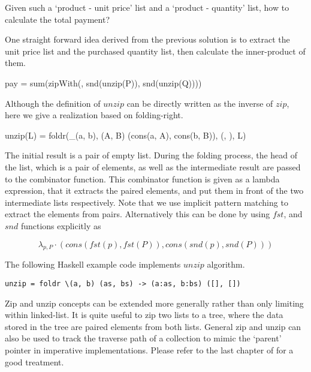 \documentclass[UTF8]{article}
\begin{document}
Given such a `product - unit price' list and a `product - quantity' list, how to calculate the total payment?

One straight forward idea derived from the previous solution is to extract the unit price list and the purchased
quantity list, then calculate the inner-product of them.

\be
pay = sum(zipWith(\times, snd(unzip(P)), snd(unzip(Q))))
\ee

Although the definition of $unzip$ can be directly written as the inverse of $zip$, here we give a realization based on
folding-right.

\be
unzip(L) = foldr(\lambda_{(a, b), (A, B)} \cdot (cons(a, A), cons(b, B)), (\phi, \phi), L)
\ee

The initial result is a pair of empty list. During the folding process, the head of the list, which is a pair
of elements, as well as the intermediate result are passed to the combinator function. This combinator function
is given as a lambda expression, that it extracts the paired elements, and put them in front of the two
intermediate lists respectively. Note that we use implicit pattern matching to extract the elements from
pairs. Alternatively this can be done by using $fst$, and $snd$ functions explicitly as

\[
\lambda_{p, P} \cdot (cons(fst(p), fst(P)), cons(snd(p), snd(P)))
\]

The following Haskell example code implements $unzip$ algorithm.

\lstset{language=Haskell}
\begin{lstlisting}
unzip = foldr \(a, b) (as, bs) -> (a:as, b:bs) ([], [])
\end{lstlisting}

Zip and unzip concepts can be extended more generally rather than only limiting within linked-list. It is quite
useful to zip two lists to a tree, where the data stored in the tree are paired elements from both lists.
General zip and unzip can also be used to track the traverse path of a collection to mimic the `parent' pointer
in imperative implementations. Please refer to the last chapter of \cite{learn-haskell} for a good treatment.
\end{document}
